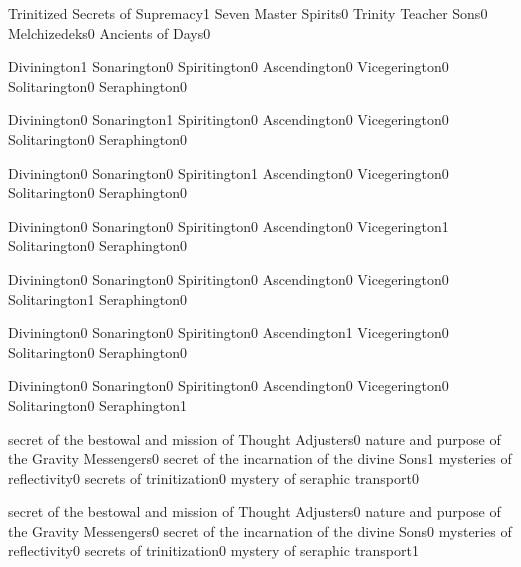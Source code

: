 {Trinitized Secrets of Supremacy}{1}
{Seven Master Spirits}{0}
{Trinity Teacher Sons}{0}
{Melchizedeks}{0}
{Ancients of Days}{0}
\qstop

{Divinington}{1}
{Sonarington}{0}
{Spiritington}{0}
{Ascendington}{0}
{Vicegerington}{0}
{Solitarington}{0}
{Seraphington}{0}
\qstop

{Divinington}{0}
{Sonarington}{1}
{Spiritington}{0}
{Ascendington}{0}
{Vicegerington}{0}
{Solitarington}{0}
{Seraphington}{0}
\qstop

{Divinington}{0}
{Sonarington}{0}
{Spiritington}{1}
{Ascendington}{0}
{Vicegerington}{0}
{Solitarington}{0}
{Seraphington}{0}
\qstop

{Divinington}{0}
{Sonarington}{0}
{Spiritington}{0}
{Ascendington}{0}
{Vicegerington}{1}
{Solitarington}{0}
{Seraphington}{0}
\qstop

{Divinington}{0}
{Sonarington}{0}
{Spiritington}{0}
{Ascendington}{0}
{Vicegerington}{0}
{Solitarington}{1}
{Seraphington}{0}
\qstop

{Divinington}{0}
{Sonarington}{0}
{Spiritington}{0}
{Ascendington}{1}
{Vicegerington}{0}
{Solitarington}{0}
{Seraphington}{0}
\qstop

{Divinington}{0}
{Sonarington}{0}
{Spiritington}{0}
{Ascendington}{0}
{Vicegerington}{0}
{Solitarington}{0}
{Seraphington}{1}
\qstop

{secret of the bestowal and mission of Thought Adjusters}{0}
{nature and purpose of the Gravity Messengers}{0}
{secret of the incarnation of the divine Sons}{1}
{mysteries of reflectivity}{0}
{secrets of trinitization}{0}
{mystery of seraphic transport}{0}
\qstop

{secret of the bestowal and mission of Thought Adjusters}{0}
{nature and purpose of the Gravity Messengers}{0}
{secret of the incarnation of the divine Sons}{0}
{mysteries of reflectivity}{0}
{secrets of trinitization}{0}
{mystery of seraphic transport}{1}
\qstop

